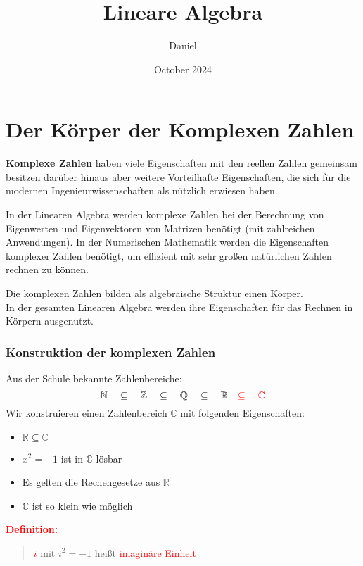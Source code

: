 \documentclass{article}
\title{Lineare Algebra}
\author{Daniel}
\date{October 2024}
\newcommand{\mesp}{\phantom{\hspace{10px}}}
\newcommand{\red}[1]{\textcolor{red}{#1}}
\newcommand{\de}[1]{\red{\textbf{Definition: }}\begin{quote}#1\end{quote}}
\newcommand{\N}{\mathbb{N}}
\newcommand{\Z}{\mathbb{Z}}
\newcommand{\Q}{\mathbb{Q}}
\newcommand{\R}{\mathbb{R}}
\newcommand{\C}{\mathbb{C}}
\begin{document}
\maketitle
\tableofcontents

\newpage
\section{Der Körper der Komplexen Zahlen}

{\bf Komplexe Zahlen} haben viele Eigenschaften mit den reellen Zahlen gemeinsam besitzen darüber hinaus aber weitere Vorteilhafte Eigenschaften, die sich für die modernen Ingenieurwissenschaften als nützlich erwiesen haben.

In der Linearen Algebra werden komplexe Zahlen bei der Berechnung von Eigenwerten und Eigenvektoren von Matrizen benötigt (mit zahlreichen Anwendungen). In der Numerischen Mathematik werden die Eigenschaften komplexer Zahlen benötigt, um effizient mit sehr großen natürlichen Zahlen rechnen zu können.

Die komplexen Zahlen bilden als algebraische Struktur einen Körper. \\
In der gesamten Linearen Algebra werden ihre Eigenschaften für das Rechnen in Körpern ausgenutzt.

{}
\subsubsection{Konstruktion der komplexen Zahlen}

Aus der Schule bekannte Zahlenbereiche:
\begin{equation*} \label{zahlenbereiche}
    \N \mesp \subseteq \mesp \Z \mesp \subseteq \mesp \Q \mesp \subseteq \mesp \R \mesp \red{\subseteq \mesp \C}
\end{equation*}
Wir konstruieren einen Zahlenbereich $\C$ mit folgenden Eigenschaften:
\begin{itemize}
    \item $\R \subseteq \C$
    \item $x^2 = -1$ ist in $\C$ lösbar
    \item Es gelten die Rechengesetze aus $\R$
    \item $\C$ ist so klein wie möglich
\end{itemize}
\de{\red{$i$} mit $i^2 = -1$ heißt \red{imaginäre Einheit}}
\end{document}
